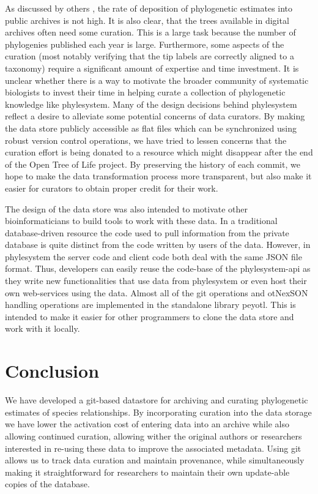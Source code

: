 \documentclass{bioinfo}
\newcommand{\ps}{phylesystem\xspace}
\newcommand{\otol}{Open Tree of Life\xspace}
\newcommand{\nexson}{otNexSON\xspace}
\begin{document}
As discussed by others \citep{DrewEtAl2013,MageeMM2014}, the rate of deposition of phylogenetic
    estimates into public archives is not high.
It is also clear, that the trees available in digital archives often need some curation.
This is a large task because the number of phylogenies published each year is large.
Furthermore, some aspects of the curation (most notably verifying that the tip labels are correctly
    aligned to a taxonomy) require a significant amount of expertise and time investment.
It is unclear whether there is a way to motivate the broader community of systematic biologists to
    invest their time in helping curate a collection of phylogenetic knowledge like \ps.
Many of the design decisions behind \ps reflect a desire to alleviate some potential concerns
    of data curators.
By making the data store publicly accessible as flat files which can be synchronized using robust
    version control operations, we have tried to lessen
    concerns that the curation effort is being donated to a resource which might disappear
    after the end of the \otol project.
By preserving the history of each commit, we hope to make the data transformation process more 
    transparent, but also make it easier for curators to obtain proper credit for their work.

The design of the data store was also intended to motivate other bioinformaticians to
    build tools to work with these data.
In a traditional database-driven resource the code used to pull information from the private
    database is quite distinct from the code written by users of the data.
However, in \ps the server code and client code both deal with the same JSON file format.
Thus, developers can easily reuse the code-base of the \ps-api as they write new functionalities
    that use data from \ps or even host their own web-services using the data.
Almost all of the git operations and \nexson handling operations are implemented in the standalone
    library peyotl.
This is intended to make it easier for other programmers to clone
    the data store and work with it locally.

\section{Conclusion}
We have developed a git-based datastore for archiving and curating phylogenetic estimates of species relationships.
By incorporating curation into the data storage we have lower the activation cost of entering data into
    an archive while also allowing continued curation, allowing wither the original authors or researchers
    interested in re-using these data to improve the associated metadata.
Using git allows us to track data curation and maintain provenance, while simultaneously making it straightforward
    for researchers to maintain their own update-able copies of the database.
\end{document}
